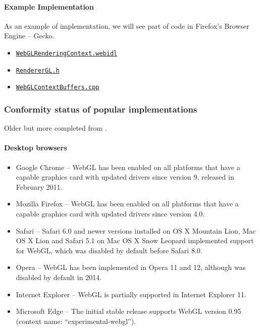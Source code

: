 \documentclass[]{article}
\begin{document}
\paragraph{Example Implementation}\label{example-implementation}

As an example of implementation, we will see part of code in Firefox's
Browser Engine -- Gecko.

\begin{itemize}
\itemsep1pt\parskip0pt
\item
  \href{https://github.com/mozilla/gecko-dev/blob/5a7da7930ebba958d98e2e42ed07d05c34d1873a/dom/webidl/WebGLRenderingContext.webidl}{\texttt{WebGLRenderingContext.webidl}}
\item
  \href{https://github.com/mozilla/gecko-dev/blob/71900c9741a8fafb137d9a57519dfa0fe280c4dc/gfx/angle/src/libANGLE/renderer/gl/RendererGL.h}{\texttt{RendererGL.h}}
\item
  \href{https://github.com/mozilla/gecko-dev/blob/7a82450687cc47dad34e3c89ca94cbd60bfd1aa6/dom/canvas/WebGLContextBuffers.cpp}{\texttt{WebGLContextBuffers.cpp}}
\end{itemize}

\subsubsection{Conformity status of popular
implementations}\label{conformity-status-of-popular-implementations}

Older but more completed from \cite{webglwiki}.

\paragraph{Desktop browsers}\label{desktop-browsers}

\begin{itemize}
\itemsep1pt\parskip0pt
\item
  Google Chrome -- WebGL has been enabled on all platforms that have a
  capable graphics card with updated drivers since version 9, released
  in February 2011.
\item
  Mozilla Firefox -- WebGL has been enabled on all platforms that have a
  capable graphics card with updated drivers since version 4.0.
\item
  Safari -- Safari 6.0 and newer versions installed on OS X Mountain
  Lion, Mac OS X Lion and Safari 5.1 on Mac OS X Snow Leopard
  implemented support for WebGL, which was disabled by default before
  Safari 8.0.
\item
  Opera -- WebGL has been implemented in Opera 11 and 12, although was
  disabled by default in 2014.
\item
  Internet Explorer -- WebGL is partially supported in Internet Explorer
  11.
\item
  Microsoft Edge -- The initial stable release supports WebGL version
  0.95 (context name: ``experimental-webgl'').
\end{itemize}
\end{document}
